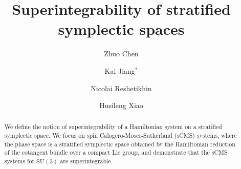 \documentclass[12pt]{amsart}
\theoremstyle{definition}
\numberwithin{equation}{section}
\newcommand{\SU}{\mathrm{SU}}
\begin{document}
	\begin{abstract}We define the notion of superintegrability of a Hamiltonian system on a  stratified symplectic space. We focus on spin Calogero-Moser-Sutherland (sCMS) systems, where the phase space is a stratified symplectic space obtained by the Hamiltonian reduction of the cotangent bundle over a compact Lie group, and demonstrate that the sCMS systems for $\SU(3)$ are superintegrable.




\end{abstract}
	
	\title[]{Superintegrability of stratified symplectic spaces}
	
	
	\author{Zhuo Chen}%
	\address{Department of Mathematics, Tsinghua University, Beijing 100084, China}%
	
	\author{Kai Jiang$^*$} 
	\address{Paris Curie Engineer School, Beijing University of Chemical Technology, Beijing 100029, China}
	
	\author{Nicolai Reshetikhin} 
	\address{YMSC, Tsinghua University, Beijing 100084, China; BIMSA, Beijing, China, \& Department of Mathematics and Computer Sciences, St. Petersburg University, Russian Federation}
	
	\author{Husileng Xiao}%
	\address{College of Mathematical Sciences, Harbin Engineering University, Harbin, 150001, China}%
	
\end{document}

